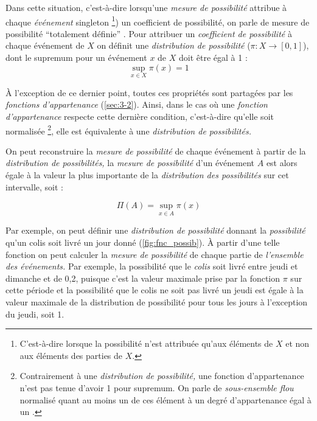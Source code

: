 Dans cette situation, c'est-à-dire lorsqu'une \emph{mesure de
  possibilité} attribue à chaque \emph{événement} singleton
\footnote{C'est-à-dire lorsque la possibilité n'est attribuée qu'aux
  éléments de \(X\) et non aux éléments des parties de \(X\).}) un
coefficient de possibilité, on parle de mesure de possibilité
\enquote{totalement définie} \autocite{Bouchon-Meunier2007}. Pour
attribuer un \emph{coefficient de possibilité} à chaque événement de
\(X\) on définit une \emph{distribution de possibilité}
(\(π : X → [0,1]\)), dont le supremum pour un événement \(x\) de \(X\)
doit être égal à 1 :
%
\begin{equation}
  \sup_{x ∈ X}π(x)=1
\end{equation}

À l'exception de ce dernier point, toutes ces propriétés sont
partagées par les \emph{fonctions d'appartenance}
(\autoref{sec:3-2}). Ainsi, dans le cas où une \emph{fonction
  d'appartenance} respecte cette dernière condition, c'est-à-dire
qu'elle soit normalisée \footnote{Contrairement à une
  \emph{distribution de possibilité,} une fonction d'appartenance
  n'est pas tenue d'avoir 1 pour supremum. On parle de
  \emph{sous-ensemble flou} normalisé quant au moins un de ces élément
  à un degré d’appartenance égal à un
  \autocite{Bouchon-Meunier2007}.}, elle est équivalente à une
\emph{distribution de possibilités.}

On peut reconstruire la \emph{mesure de possibilité} de chaque
événement à partir de la \emph{distribution de possibilités,} la
\emph{mesure de possibilité} d'un événement \(A\) est alors égale à la
valeur la plus importante de la \emph{distribution des possibilités}
sur cet intervalle, soit :

\begin{equation}
  \Pi(A) = \sup_{x \in A}\pi(x)
\end{equation}

Par exemple, on peut définir une \emph{distribution de possibilité}
donnant la \emph{possibilité} qu'un colis soit livré un jour donné
(\autoref{fig:fnc_possib}). À partir d'une telle fonction on peut
calculer la \emph{mesure de possibilité} de chaque partie de
\emph{l'ensemble des événements.} Par exemple, la possibilité que le
\emph{colis} soit livré entre jeudi et dimanche et de 0,2, puisque
c'est la valeur maximale prise par la fonction \(\pi\) sur cette
période et la possibilité que le colis ne soit pas livré un jeudi est
égale à la valeur maximale de la distribution de possibilité pour tous
les jours à l'exception du jeudi, soit 1.

